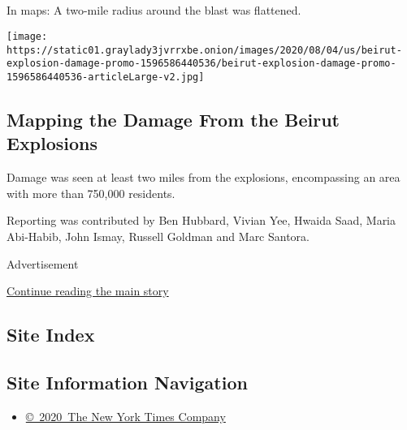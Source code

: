 \hypertarget{-4}{%
\subsection{}\label{-4}}

In maps: A two-mile radius around the blast was flattened.

\href{https://www.nytimes3xbfgragh.onion/interactive/2020/08/04/world/middleeast/beirut-explosion-damage.html}{}

\texttt{[image: https://static01.graylady3jvrrxbe.onion/images/2020/08/04/us/beirut-explosion-damage-promo-1596586440536/beirut-explosion-damage-promo-1596586440536-articleLarge-v2.jpg]}

\hypertarget{mapping-the-damage-from-the-beirut-explosions}{%
\subsection{Mapping the Damage From the Beirut
Explosions}\label{mapping-the-damage-from-the-beirut-explosions}}

Damage was seen at least two miles from the explosions, encompassing an
area with more than 750,000 residents.

Reporting was contributed by Ben Hubbard, Vivian Yee, Hwaida Saad, Maria
Abi-Habib, John Ismay, Russell Goldman and Marc Santora.

Advertisement

\protect\hyperlink{after-bottom}{Continue reading the main story}

\hypertarget{site-index}{%
\subsection{Site Index}\label{site-index}}

\hypertarget{site-information-navigation}{%
\subsection{Site Information
Navigation}\label{site-information-navigation}}

\begin{itemize}
\tightlist
\item
  \href{https://help.nytimes3xbfgragh.onion/hc/en-us/articles/115014792127-Copyright-notice}{©~2020~The
  New York Times Company}
\end{itemize}

